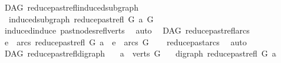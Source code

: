 \begin{isabellebody}
\endisatagproof
{\isafoldproof}%
%
\isadelimproof
%
\endisadelimproof
%
\isadelimdocument
%
\endisadelimdocument
%
\isatagdocument
%
\isamarkuptrue%
%
\endisatagdocument
{\isafolddocument}%
%
\isadelimdocument
%
\endisadelimdocument
{}\isamarkupfalse%
\ {\isacharparenleft}{\kern0pt}\ DAG{\isacharparenright}{\kern0pt}\ reduce{\isacharunderscore}{\kern0pt}past{\isacharunderscore}{\kern0pt}refl{\isacharunderscore}{\kern0pt}induced{\isacharunderscore}{\kern0pt}subgraph{\isacharcolon}{\kern0pt}\isanewline
\ \ \ {\isachardoublequoteopen}induced{\isacharunderscore}{\kern0pt}subgraph\ {\isacharparenleft}{\kern0pt}reduce{\isacharunderscore}{\kern0pt}past{\isacharunderscore}{\kern0pt}refl\ G\ a{\isacharparenright}{\kern0pt}\ G{\isachardoublequoteclose}\isanewline
%
\isadelimproof
\ \ %
\endisadelimproof
%
\isatagproof
{}\isamarkupfalse%
\ \ induced{\isacharunderscore}{\kern0pt}induce\ past{\isacharunderscore}{\kern0pt}nodes{\isacharunderscore}{\kern0pt}refl{\isacharunderscore}{\kern0pt}verts\ \isamarkupfalse%
\ auto%
\endisatagproof
{\isafoldproof}%
%
\isadelimproof
\isanewline
%
\endisadelimproof
\isanewline
{}\isamarkupfalse%
\ {\isacharparenleft}{\kern0pt}\ DAG{\isacharparenright}{\kern0pt}\ reduce{\isacharunderscore}{\kern0pt}past{\isacharunderscore}{\kern0pt}refl{\isacharunderscore}{\kern0pt}arcs{}{\isacharcolon}{\kern0pt}\isanewline
\ \ {\isachardoublequoteopen}e\ {\isasymin}\ arcs\ {\isacharparenleft}{\kern0pt}reduce{\isacharunderscore}{\kern0pt}past{\isacharunderscore}{\kern0pt}refl\ G\ a{\isacharparenright}{\kern0pt}\ {\isasymLongrightarrow}\ e\ {\isasymin}\ arcs\ G{\isachardoublequoteclose}\isanewline
%
\isadelimproof
\ \ %
\endisadelimproof
%
\isatagproof
{}\isamarkupfalse%
\ reduce{\isacharunderscore}{\kern0pt}past{\isacharunderscore}{\kern0pt}arcs\ \isamarkupfalse%
\ auto%
\endisatagproof
{\isafoldproof}%
%
\isadelimproof
\isanewline
%
\endisadelimproof
\isanewline
{}\isamarkupfalse%
\ {\isacharparenleft}{\kern0pt}\ DAG{\isacharparenright}{\kern0pt}\ reduce{\isacharunderscore}{\kern0pt}past{\isacharunderscore}{\kern0pt}refl{\isacharunderscore}{\kern0pt}digraph{\isacharcolon}{\kern0pt}\isanewline
\ \ \ {\isachardoublequoteopen}a\ {\isasymin}\ verts\ G{\isachardoublequoteclose}\isanewline
\ \ \ {\isachardoublequoteopen}digraph\ {\isacharparenleft}{\kern0pt}reduce{\isacharunderscore}{\kern0pt}past{\isacharunderscore}{\kern0pt}refl\ G\ a{\isacharparenright}{\kern0pt}{\isachardoublequoteclose}\isanewline

\end{isabellebody}

